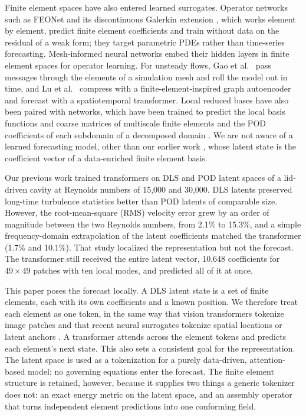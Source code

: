 \documentclass[conf]{new-aiaa}
\begin{document}
Finite element spaces have also entered learned surrogates. Operator networks such as FEONet \cite{lee2025feonet} and its discontinuous Galerkin extension \cite{chawla2026dgfeonet}, which works element by element, predict finite element coefficients and train without data on the residual of a weak form; they target parametric PDEs rather than time-series forecasting. Mesh-informed neural networks \cite{franco2023minn} embed their hidden layers in finite element spaces for operator learning. For unsteady flows, Gao et al.~\cite{gao2024hypergraph} pass messages through the elements of a simulation mesh and roll the model out in time, and Lu et al.~\cite{lu2026graphrom} compress with a finite-element-inspired graph autoencoder and forecast with a spatiotemporal transformer. Local reduced bases have also been paired with networks, which have been trained to predict the local basis functions and coarse matrices of multiscale finite elements \cite{wang2019gmsfem} and the POD coefficients of each subdomain of a decomposed domain \cite{pan2024ddpdcnn}. We are not aware of a learned forecasting model, other than our earlier work \cite{morton2026scitech}, whose latent state is the coefficient vector of a data-enriched finite element basis.

Our previous work \cite{morton2026scitech} trained transformers on DLS and POD latent spaces of a lid-driven cavity at Reynolds numbers of 15,000 and 30,000. DLS latents preserved long-time turbulence statistics better than POD latents of comparable size. However, the root-mean-square (RMS) velocity error grew by an order of magnitude between the two Reynolds numbers, from 2.1\% to 15.3\%, and a simple frequency-domain extrapolation of the latent coefficients matched the transformer (1.7\% and 10.1\%). That study localized the representation but not the forecast. The transformer still received the entire latent vector, 10,648 coefficients for $49\times49$ patches with ten local modes, and predicted all of it at once.

This paper poses the forecast locally. A DLS latent state is a set of finite elements, each with its own coefficients and a known position. We therefore treat each element as one token, in the same way that vision transformers tokenize image patches \cite{dosovitskiy2021vit} and that recent neural surrogates tokenize spatial locations or latent anchors \cite{serrano2024aroma,alkin2024upt}. A transformer attends across the element tokens and predicts each element's next state. This also sets a consistent goal for the representation. The latent space is used as a tokenization for a purely data-driven, attention-based model; no governing equations enter the forecast. The finite element structure is retained, however, because it supplies two things a generic tokenizer does not: an exact energy metric on the latent space, and an assembly operator that turns independent element predictions into one conforming field.
\end{document}
